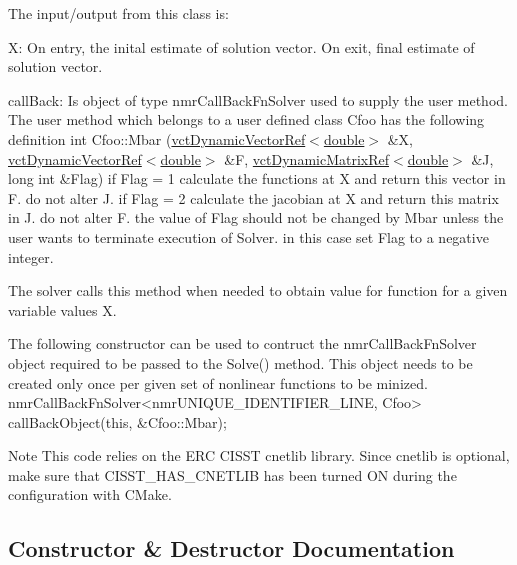The input/output from this class is\+:
\begin{DoxyItemize}
\item X\+: On entry, the inital estimate of solution vector. On exit, final estimate of solution vector.
\item call\+Back\+: Is object of type nmr\+Call\+Back\+Fn\+Solver used to supply the user method. The user method which belongs to a user defined class \textquotesingle{}Cfoo\textquotesingle{} has the following definition int Cfoo\+::\+Mbar (\hyperlink{classvct_dynamic_vector_ref}{vct\+Dynamic\+Vector\+Ref$<$double$>$} \&X, \hyperlink{classvct_dynamic_vector_ref}{vct\+Dynamic\+Vector\+Ref$<$double$>$} \&F, \hyperlink{classvct_dynamic_matrix_ref}{vct\+Dynamic\+Matrix\+Ref$<$double$>$} \&J, long int \&Flag) if Flag = 1 calculate the functions at X and return this vector in F. do not alter J. if Flag = 2 calculate the jacobian at X and return this matrix in J. do not alter F. the value of Flag should not be changed by Mbar unless the user wants to terminate execution of Solver. in this case set Flag to a negative integer.
\end{DoxyItemize}

\begin{DoxyVerb}  The solver calls this method when needed to obtain value for function for
  a given variable values X.

  The following constructor can be used to contruct the nmrCallBackFnSolver object
  required to be passed to the Solve() method. This object needs to be created
  only once per given set of nonlinear functions to be minized.
      nmrCallBackFnSolver<nmrUNIQUE_IDENTIFIER_LINE, Cfoo> callBackObject(this, &Cfoo::Mbar);
\end{DoxyVerb}


\begin{DoxyNote}{Note}
This code relies on the E\+R\+C C\+I\+S\+S\+T cnetlib library. Since cnetlib is optional, make sure that C\+I\+S\+S\+T\+\_\+\+H\+A\+S\+\_\+\+C\+N\+E\+T\+L\+I\+B has been turned O\+N during the configuration with C\+Make. 
\end{DoxyNote}


\subsection{Constructor \& Destructor Documentation}
\hypertarget{classnmr_fn_jacobian_solver_a42945a9762a21086dbed694fb2eae847}{}
